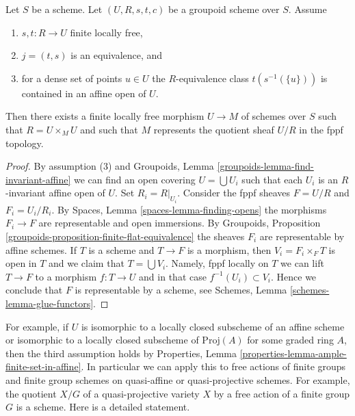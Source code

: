\begin{proposition}
\label{proposition-finite-flat-equivalence-global}
Let $S$ be a scheme.
Let $(U, R, s, t, c)$ be a groupoid scheme over $S$.
Assume
\begin{enumerate}
\item $s, t : R \to U$ finite locally free,
\item $j = (t, s)$ is an equivalence, and
\item for a dense set of points $u \in U$ the $R$-equivalence class
$t(s^{-1}(\{u\}))$ is contained in an affine open of $U$.
\end{enumerate}
Then there exists a finite locally free morphism $U \to M$
of schemes over $S$ such that $R = U \times_M U$ and such that $M$
represents the quotient sheaf $U/R$ in the fppf topology.
\end{proposition}

\begin{proof}
By assumption (3) and
Groupoids, Lemma \ref{groupoids-lemma-find-invariant-affine}
we can find an open covering $U = \bigcup U_i$ such that each $U_i$
is an $R$-invariant affine open of $U$. Set $R_i = R|_{U_i}$.
Consider the fppf sheaves $F = U/R$ and $F_i = U_i/R_i$.
By Spaces, Lemma \ref{spaces-lemma-finding-opens} the morphisms
$F_i \to F$ are representable and open immersions.
By Groupoids, Proposition \ref{groupoids-proposition-finite-flat-equivalence}
the sheaves $F_i$ are representable by affine schemes.
If $T$ is a scheme and $T \to F$ is a morphism, then $V_i = F_i \times_F T$
is open in $T$ and we claim that $T = \bigcup V_i$. Namely,
fppf locally on $T$ we can lift $T \to F$ to a morphism
$f : T \to U$ and in that case $f^{-1}(U_i) \subset V_i$.
Hence we conclude that $F$ is representable by a scheme, see
Schemes, Lemma \ref{schemes-lemma-glue-functors}.
\end{proof}

\noindent
For example, if $U$ is isomorphic to a locally closed subscheme of an
affine scheme or isomorphic to a locally closed subscheme of
$\text{Proj}(A)$ for some graded ring $A$, then the third assumption holds by
Properties, Lemma \ref{properties-lemma-ample-finite-set-in-affine}.
In particular we can apply this to free actions of finite groups and
finite group schemes on quasi-affine or quasi-projective schemes.
For example, the quotient $X/G$ of a quasi-projective variety
$X$ by a free action of a finite group $G$ is a scheme. Here is a
detailed statement.

